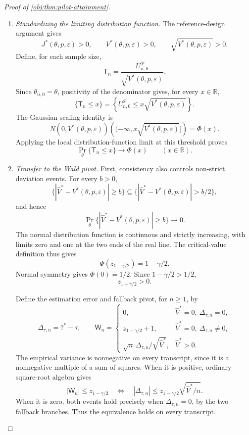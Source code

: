 \documentclass[11pt]{article}
\begin{document}
\begin{proof}[Proof of \cref{obj:thm:pilot-attainment}]
\begin{enumerate}
\item \emph{Standardizing the limiting distribution function.}
The reference-design argument gives
\[
J^*(\theta,p,\varepsilon)>0,
\qquad
V^*(\theta,p,\varepsilon)>0,
\qquad
\sqrt{V^*(\theta,p,\varepsilon)}>0.
\]
Define, for each sample size,
\[
\mathsf T_n
=\frac{U_{n,0}^{\mathcal P}}
{\sqrt{V^*(\theta,p,\varepsilon)}}.
\]
Since \(\theta_{n,0}=\theta\), positivity of the denominator gives, for every \(x\in\mathbb R\),
\[
\{\mathsf T_n\le x\}
=
\left\{U_{n,0}^{\mathcal P}
\le x\sqrt{V^*(\theta,p,\varepsilon)}\right\}.
\]
The Gaussian scaling identity is
\[
N(0,V^*(\theta,p,\varepsilon))
\left((-\infty,x\sqrt{V^*(\theta,p,\varepsilon)}]\right)
=\Phi(x).
\]
Applying the local distribution-function limit at this threshold proves
\[
\Pr_\theta\{\mathsf T_n\le x\}\longrightarrow\Phi(x)
\qquad(x\in\mathbb R).
\]

\item \emph{Transfer to the Wald pivot.}
First, consistency also controls non-strict deviation events. For every \(b>0\),
\[
\{|\widehat V^*-V^*(\theta,p,\varepsilon)|\ge b\}
\subseteq
\{|\widehat V^*-V^*(\theta,p,\varepsilon)|>b/2\},
\]
and hence
\[
\Pr_\theta\{|\widehat V^*-V^*(\theta,p,\varepsilon)|\ge b\}
\longrightarrow0.
\]
The normal distribution function is continuous and strictly increasing, with limits zero and one at the two ends of the real line. The critical-value definition thus gives
\[
\Phi(z_{1-\gamma/2})=1-\gamma/2.
\]
Normal symmetry gives \(\Phi(0)=1/2\). Since \(1-\gamma/2>1/2\),
\[
z_{1-\gamma/2}>0.
\]

Define the estimation error and fallback pivot, for \(n\ge1\), by
\[
\Delta_{\tau,n}=\widehat\tau^*-\tau,
\qquad
\mathsf W_n=
\begin{cases}
0,&\widehat V^*=0,\ \Delta_{\tau,n}=0,\\
z_{1-\gamma/2}+1,&\widehat V^*=0,\ \Delta_{\tau,n}\ne0,\\
\sqrt n\,\Delta_{\tau,n}/\sqrt{\widehat V^*},
&\widehat V^*>0.
\end{cases}
\]
The empirical variance is nonnegative on every transcript, since it is a nonnegative multiple of a sum of squares. When it is positive, ordinary square-root algebra gives
\[
|\mathsf W_n|\le z_{1-\gamma/2}
\quad\Longleftrightarrow\quad
|\Delta_{\tau,n}|
\le z_{1-\gamma/2}\sqrt{\widehat V^*/n}.
\]
When it is zero, both events hold precisely when \(\Delta_{\tau,n}=0\), by the two fallback branches. Thus the equivalence holds on every transcript.


\end{enumerate}
\end{proof}
\end{document}
